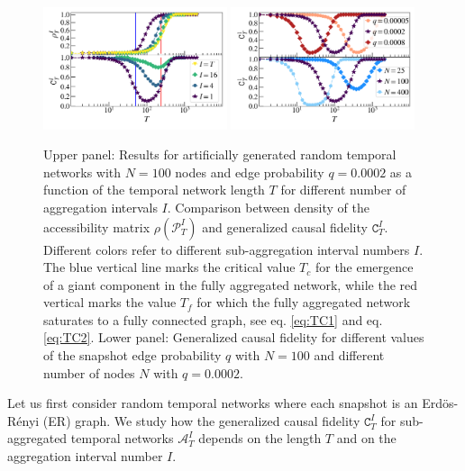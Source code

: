 \documentclass[%
 reprint,
 amsmath,amssymb,
 aps,
]{revtex4-2}
\begin{document}
\begin{figure}[]
\includegraphics[width=0.48\textwidth]{fig/ER_cr.png}
\includegraphics[width = 0.48\textwidth]{fig/ER_Nq.png}
\caption{\label{fig:ERcf} Upper panel: Results for artificially generated random temporal networks with $N=100$ nodes and  edge probability $q= 0.0002$ as a function of the temporal network length $T$ for different number of aggregation intervals $I$.
Comparison between density of the accessibility matrix $\rho(\mathcal{P}^I_T)$ and 
generalized causal fidelity $\mathtt{C}^I_T$. 
Different colors refer to different sub-aggregation interval numbers $I$.
The blue vertical line marks the critical value $T_c$ for the emergence of a giant component in the fully aggregated network, while the red vertical marks the value  $T_f$ for which the fully aggregated network saturates to a fully connected graph, see eq. \eqref{eq:TC1} and eq. \eqref{eq:TC2}. Lower panel: Generalized causal fidelity for different values of the snapshot edge probability $q$ with $N=100$ and different number of nodes $N$ with $q=0.0002$. 
}
\end{figure}

Let us first consider random temporal networks where each snapshot is an Erd\"os-R\'enyi (ER) graph. We study how the generalized causal fidelity $\mathtt{C}^I_T$ for sub-aggregated temporal networks  $\mathcal{A}^I_T$ depends on the length $T$ and on the aggregation interval number $I$.
\end{document}
